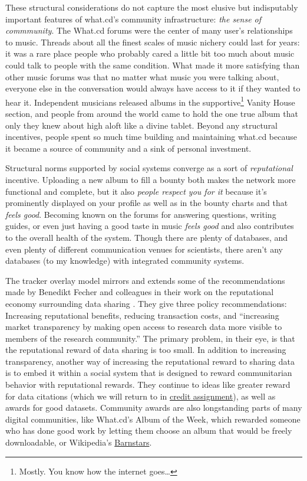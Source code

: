 \documentclass[11pt]{article}
\begin{document}
\begin{multicols}{2}
These structural considerations do not capture the most elusive but
indisputably important features of what.cd's community infrastructure:
\emph{the sense of commmunity}. The What.cd forums were the center of
many user's relationships to music. Threads about all the finest scales
of music nichery could last for years: it was a rare place people who
probably cared a little bit too much about music could talk to people
with the same condition. What made it more satisfying than other music
forums was that no matter what music you were talking about, everyone
else in the conversation would always have access to it if they wanted
to hear it. Independent musicians released albums in the
supportive\footnote{Mostly. You know how the internet goes\ldots{}}
Vanity House section, and people from around the world came to hold the
one true album that only they knew about high aloft like a divine
tablet. Beyond any structural incentives, people spent so much time
building and maintaining what.cd because it became a source of community
and a sink of personal investment.

Structural norms supported by social systems converge as a sort of
\emph{reputational} incentive. Uploading a new album to fill a bounty
both makes the network more functional and complete, but it also
\emph{people respect you for it} because it's prominently displayed on
your profile as well as in the bounty charts and that \emph{feels good}.
Becoming known on the forums for answering questions, writing guides, or
even just having a good taste in music \emph{feels good} and also
contributes to the overall health of the system. Though there are plenty
of databases, and even plenty of different communication venues for
scientists, there aren't any databases (to my knowledge) with integrated
community systems.

The tracker overlay model mirrors and extends some of the
recommendations made by Benedikt Fecher and colleagues in their work on
the reputational economy surrounding data sharing \cite{fecherReputationEconomyHow2017} . They give three policy
recommendations: Increasing reputational benefits, reducing transaction
costs, and ``increasing market transparency by making open access to
research data more visible to members of the research community.'' The
primary problem, in their eye, is that the reputational reward of data
sharing is too small. In addition to increasing transparency, another
way of increasing the reputational reward to sharing data is to embed it
within a social system that is designed to reward communitarian behavior
with reputational rewards. They continue to ideas like greater reward
for data citations (which we will return to in
\protect\hyperlink{credit-assignment}{credit assignment}), as well as
awards for good datasets. Community awards are also longstanding parts
of many digital communities, like What.cd's Album of the Week, which
rewarded someone who has done good work by letting them choose an album
that would be freely downloadable, or Wikipedia's
\href{https://en.wikipedia.org/wiki/Wikipedia:Barnstars}{Barnstars}.


\end{multicols}
\end{document}

